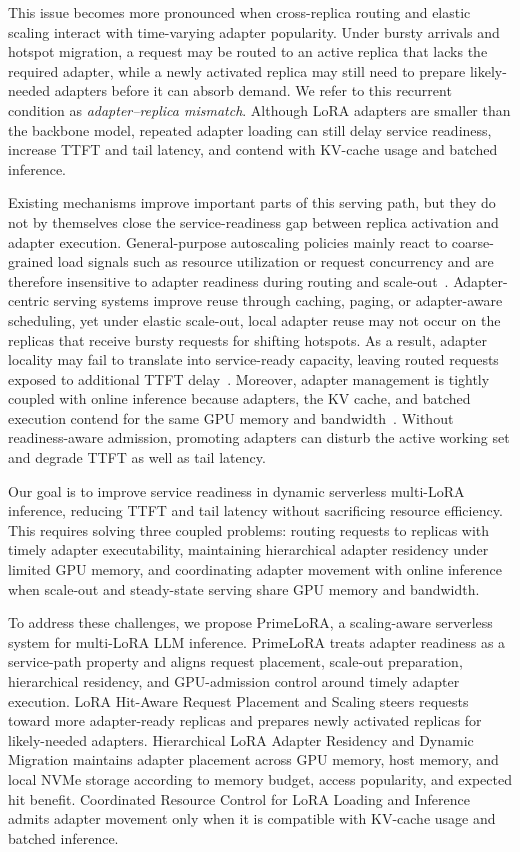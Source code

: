 \documentclass[lettersize,journal]{IEEEtran}
\begin{document}
This issue becomes more pronounced when cross-replica routing and elastic scaling interact with time-varying adapter popularity. Under bursty arrivals and hotspot migration, a request may be routed to an active replica that lacks the required adapter, while a newly activated replica may still need to prepare likely-needed adapters before it can absorb demand. We refer to this recurrent condition as \emph{adapter--replica mismatch}. Although LoRA adapters are smaller than the backbone model, repeated adapter loading can still delay service readiness, increase TTFT and tail latency, and contend with KV-cache usage and batched inference.

Existing mechanisms improve important parts of this serving path, but they do not by themselves close the service-readiness gap between replica activation and adapter execution. General-purpose autoscaling policies mainly react to coarse-grained load signals such as resource utilization or request concurrency and are therefore insensitive to adapter readiness during routing and scale-out~\cite{GameTheoryScheduling}. Adapter-centric serving systems improve reuse through caching, paging, or adapter-aware scheduling, yet under elastic scale-out, local adapter reuse may not occur on the replicas that receive bursty requests for shifting hotspots. As a result, adapter locality may fail to translate into service-ready capacity, leaving routed requests exposed to additional TTFT delay~\cite{SLoRA,Chameleon}. Moreover, adapter management is tightly coupled with online inference because adapters, the KV cache, and batched execution contend for the same GPU memory and bandwidth~\cite{FASTLIBRA}. Without readiness-aware admission, promoting adapters can disturb the active working set and degrade TTFT as well as tail latency.

Our goal is to improve service readiness in dynamic serverless multi-LoRA inference, reducing TTFT and tail latency without sacrificing resource efficiency. This requires solving three coupled problems: routing requests to replicas with timely adapter executability, maintaining hierarchical adapter residency under limited GPU memory, and coordinating adapter movement with online inference when scale-out and steady-state serving share GPU memory and bandwidth.

To address these challenges, we propose PrimeLoRA, a scaling-aware serverless system for multi-LoRA LLM inference. PrimeLoRA treats adapter readiness as a service-path property and aligns request placement, scale-out preparation, hierarchical residency, and GPU-admission control around timely adapter execution. LoRA Hit-Aware Request Placement and Scaling steers requests toward more adapter-ready replicas and prepares newly activated replicas for likely-needed adapters. Hierarchical LoRA Adapter Residency and Dynamic Migration maintains adapter placement across GPU memory, host memory, and local NVMe storage according to memory budget, access popularity, and expected hit benefit. Coordinated Resource Control for LoRA Loading and Inference admits adapter movement only when it is compatible with KV-cache usage and batched inference.
\end{document}

